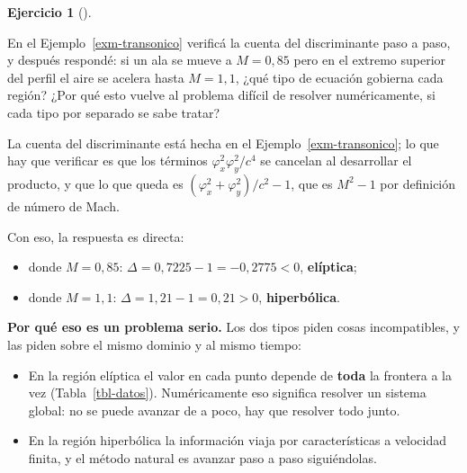 \documentclass[
  spanish,
  a4paper,
]{scrbook}
\providecommand{\tightlist}{%
  \setlength{\itemsep}{0pt}\setlength{\parskip}{0pt}}
\theoremstyle{definition}
\theoremstyle{plain}
\theoremstyle{definition}
\theoremstyle{plain}
\theoremstyle{definition}
\newtheorem{exercise}{Ejercicio}[chapter]
\theoremstyle{remark}
\begin{document}
\begin{exercise}[]\protect\hypertarget{exr-mach}{}\label{exr-mach}

En el Ejemplo~\ref{exm-transonico} verificá la cuenta del discriminante
paso a paso, y después respondé: si un ala se mueve a \(M = 0{,}85\)
pero en el extremo superior del perfil el aire se acelera hasta
\(M = 1{,}1\), ¿qué tipo de ecuación gobierna cada región? ¿Por qué esto
vuelve al problema difícil de resolver numéricamente, si cada tipo por
separado se sabe tratar?

\end{exercise}

\begin{tcolorbox}[enhanced jigsaw, arc=.35mm, bottomrule=.15mm, bottomtitle=1mm, breakable, colback=white, colbacktitle=quarto-callout-tip-color!10!white, colframe=quarto-callout-tip-color-frame, coltitle=black, left=2mm, leftrule=.75mm, opacityback=0, opacitybacktitle=0.6, rightrule=.15mm, title=\textcolor{quarto-callout-tip-color}{\faLightbulb}\hspace{0.5em}{Solución}, titlerule=0mm, toprule=.15mm, toptitle=1mm]

La cuenta del discriminante está hecha en el
Ejemplo~\ref{exm-transonico}; lo que hay que verificar es que los
términos \(\varphi_x^2\varphi_y^2/c^4\) se cancelan al desarrollar el
producto, y que lo que queda es \((\varphi_x^2+\varphi_y^2)/c^2 - 1\),
que es \(M^2-1\) por definición de número de Mach.

Con eso, la respuesta es directa:

\begin{itemize}
\tightlist
\item
  donde \(M = 0{,}85\): \(\Delta = 0{,}7225 - 1 = -0{,}2775 < 0\),
  \textbf{elíptica};
\item
  donde \(M = 1{,}1\): \(\Delta = 1{,}21 - 1 = 0{,}21 > 0\),
  \textbf{hiperbólica}.
\end{itemize}

\textbf{Por qué eso es un problema serio.} Los dos tipos piden cosas
incompatibles, y las piden sobre el mismo dominio y al mismo tiempo:

\begin{itemize}
\tightlist
\item
  En la región elíptica el valor en cada punto depende de \textbf{toda}
  la frontera a la vez (Tabla~\ref{tbl-datos}). Numéricamente eso
  significa resolver un sistema global: no se puede avanzar de a poco,
  hay que resolver todo junto.
\item
  En la región hiperbólica la información viaja por características a
  velocidad finita, y el método natural es avanzar paso a paso
  siguiéndolas.
\end{itemize}


\end{tcolorbox}
\end{document}

